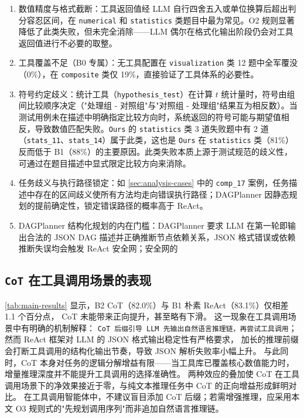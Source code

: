 \begin{enumerate}
    \item 数值精度与格式截断：工具返回值经 LLM 自行四舍五入或单位换算后超出判分容忍区间，在 \texttt{numerical} 和 \texttt{statistics} 类题目中最为常见。O2 规则显著降低了此类失败，但未完全消除——LLM 偶尔在格式化输出阶段仍会对工具返回值进行不必要的取整。
    \item 工具覆盖不足（B0 专属）：无工具配置在 \texttt{visualization} 类 12 题中全军覆没（0\%），在 \texttt{composite} 类仅 19\%，直接验证了工具体系的必要性。
    \item 符号约定歧义：统计工具（\texttt{hypothesis\_test}）在计算 $t$ 统计量时，符号由组间比较顺序决定（"处理组 - 对照组"与"对照组 - 处理组"结果互为相反数）。当测试用例未在描述中明确指定比较方向时，系统返回的符号可能与期望值相反，导致数值匹配失败。\texttt{Ours} 的 \texttt{statistics} 类 3 道失败题中有 2 道（\texttt{stats\_11}、\texttt{stats\_14}）属于此类，这也是 \texttt{Ours} 在 \texttt{statistics} 类（81\%）反而低于 B1（88\%）的主要原因。此类失败本质上源于测试规范的歧义性，可通过在题目描述中显式限定比较方向来消除。
    \item 任务歧义与执行路径锁定：如 \autoref{sec:analysis-cases} 中的 \texttt{comp\_17} 案例，任务描述中存在的区间歧义使所有方法均走向错误执行路径；DAGPlanner 因静态规划的提前确定性，锁定错误路径的概率高于 ReAct。
    \item DAGPlanner 结构化规划的内在门槛：DAGPlanner 要求 LLM 在第一轮即输出合法的 JSON DAG 描述并正确推断节点依赖关系，JSON 格式错误或依赖推断失误均会触发 ReAct 安全网；安全网的
\end{enumerate}

\subsection{\texttt{CoT} 在工具调用场景的表现}\label{sec:analysis-cot-paradox}

\autoref{tab:main-results} 显示，B2 CoT（82.0\%）与 B1 朴素 ReAct（83.1\%）仅相差 1.1 个百分点，
CoT 未能带来正向提升，甚至略有下滑。
这一现象在工具调用场景中有明确的机制解释：
\texttt{CoT 后缀引导 LLM 先输出自然语言推理链，再尝试工具调用}；然而 ReAct 框架对 LLM 的 JSON 格式输出稳定性有严格要求，
加长的推理前缀会打断工具调用的结构化输出节奏，导致 JSON 解析失败率小幅上升。
与此同时，CoT 本身对任务的逻辑分解增益有限——当工具库已覆盖核心数值能力时，增量推理深度并不能提升工具调用的选择准确性。
两种效应的叠加使 CoT 在工具调用场景下的净效果接近于零，与纯文本推理任务中 CoT 的正向增益形成鲜明对比。
在工具调用智能体中，不建议盲目添加 CoT 后缀；若需增强推理，应采用本文 O3 规则式的"先规划调用序列"而非追加自然语言推理链。

